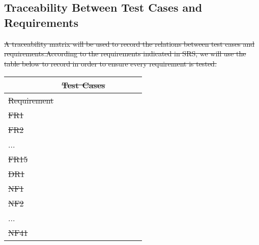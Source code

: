 
\subsection{Traceability Between Test Cases and Requirements}

{\color{red}\sout{A traceability matrix will be used to record the relations between test cases and requirements.According to the requirements indicated in SRS, we will use the table below to record in order to ensure every requirement is tested.}}
\begin{table}[htp]
{\color{red} \begin{tabular}{|l|l|l|l|l|l|}
\hline
&\sout{Test Cases} &&&&\\ \hline
\sout{Requirement} &                 &       &      &      &      \\ \hline
\sout{FR1}         & \multirow{9}{*}{ } & \multicolumn{4}{l|}{\multirow{9}{*}{}} \\ \cline{1-1}
\sout{FR2}        &                   & \multicolumn{4}{l|}{}                  \\ \cline{1-1}
...         &                   & \multicolumn{4}{l|}{}                  \\ \cline{1-1}
\sout{FR15}        &                   & \multicolumn{4}{l|}{}                  \\ \cline{1-1}
\sout{DR1}         &                   & \multicolumn{4}{l|}{}                  \\ \cline{1-1}
\sout{NF1}         &                   & \multicolumn{4}{l|}{}                  \\ \cline{1-1}
\sout{NF2}         &                   & \multicolumn{4}{l|}{}                  \\ \cline{1-1}
...         &                   & \multicolumn{4}{l|}{}                  \\ \cline{1-1}
\sout{NF41}        &                   & \multicolumn{4}{l|}{}                  \\ \hline
\end{tabular}
}\end{table}

